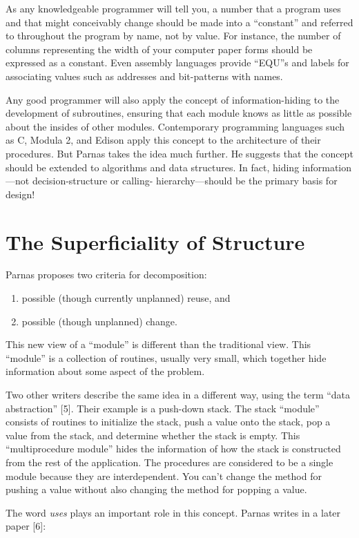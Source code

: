 As any knowledgeable programmer will tell you, a number that a program
uses and that might conceivably change should be made into a {}``constant''
and referred to throughout the program by name, not by value. For
instance, the number of columns representing the width of your computer
paper forms should be expressed as a constant. Even assembly languages
provide {}``EQU''s and labels for associating values such as addresses
and bit-patterns with names.

Any good programmer will also apply the concept of information-hiding
to the development of subroutines, ensuring that each module knows
as little as possible about the insides of other modules. Contemporary
programming languages such as C, Modula 2, and Edison apply this concept
to the architecture of their procedures. But Parnas takes the idea
much further. He suggests that the concept should be extended to algorithms
and data structures. In fact, hiding information---not decision-structure
or calling- hierarchy---should be the primary basis for design!


\section{The Superficiality of Structure}
Parnas proposes two criteria for decomposition:

\begin{enumerate}
\item possible (though currently unplanned) reuse, and
\item possible (though unplanned) change.
\end{enumerate}
This new view of a {}``module'' is different than the traditional
view. This {}``module'' is a collection of routines, usually very
small, which together hide information about some aspect of the problem. 

Two other writers describe the same idea in a different way, using
the term {}``data abstraction'' {[}5{]}. Their example is a push-down
stack. The stack {}``module'' consists of routines to initialize
the stack, push a value onto the stack, pop a value from the stack,
and determine whether the stack is empty. This {}``multiprocedure
module'' hides the information of how the stack is constructed from
the rest of the application. The procedures are considered to be a
single module because they are interdependent. You can't change the
method for pushing a value without also changing the method for popping
a value.

The word \emph{uses} plays an important role in this concept. Parnas
writes in a later paper {[}6{]}:

